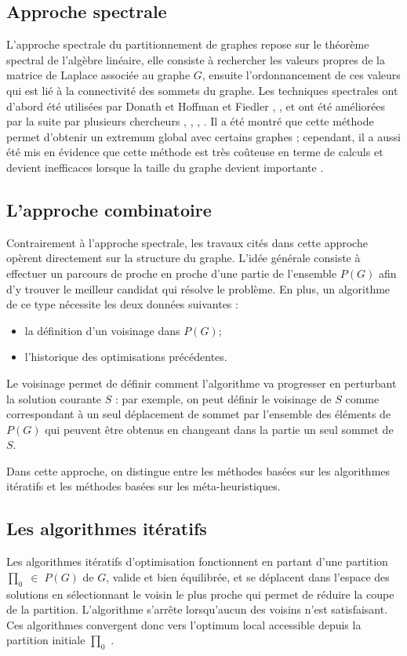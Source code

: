 \subsection*{Approche spectrale}
L'approche spectrale du partitionnement de graphes repose sur le théorème spectral de l'algèbre linéaire, elle consiste à rechercher les valeurs propres de la matrice de Laplace associée au graphe $G$, ensuite l'ordonnancement de ces valeurs qui est lié à la connectivité des sommets du graphe.
Les techniques spectrales ont d'abord été utilisées par Donath et Hoffman \citep{DonathHoffman1972} et Fiedler \citep{Fiedler1973}, \citep{Fiedler1975}, et ont été améliorées par la suite par plusieurs chercheurs \citep{Boppana1987}, \citep{HendricksonLeland1995a}, \citep{Kabelikova2006}, \citep{Simon1991}.
Il a été montré que cette méthode permet d'obtenir un extremum global avec certains graphes \citep{Pothen1990}; cependant, il a aussi été mis en évidence que cette méthode est très coûteuse en terme de calculs et devient inefficaces lorsque la taille du graphe devient importante \citep{BarnardSimon1994}.

\subsection*{L'approche combinatoire} \citep{BENSETIRA2017}
Contrairement à l'approche spectrale, les travaux cités dans cette approche opèrent directement sur la structure du graphe.
L'idée générale consiste à effectuer un parcours de proche en proche d'une partie de l'ensemble $P(G)$ afin d'y trouver le meilleur candidat qui résolve le problème. En plus, un algorithme de ce type nécessite les deux données suivantes :
\begin{itemize}
\item la définition d'un voisinage dans $P(G)$;
\item l'historique des optimisations précédentes.
\end{itemize}
Le voisinage permet de définir comment l'algorithme va progresser en perturbant la solution courante $S$ : par exemple, on peut définir le voisinage de $S$ comme correspondant à un seul déplacement de sommet par l'ensemble des éléments de $P(G)$ qui peuvent être obtenus en changeant dans la partie un seul sommet de $S$.

Dans cette approche, on distingue entre les méthodes basées sur les algorithmes itératifs et les méthodes basées sur les méta-heuristiques.

\subsection*{Les algorithmes itératifs}
Les algorithmes itératifs d'optimisation fonctionnent en partant d'une partition $\prod _0 \;\in \; P(G)$ de $G$, valide et bien équilibrée, et se déplacent dans l'espace des solutions en sélectionnant le voisin le plus proche qui permet de réduire la coupe de la partition. L'algorithme s'arrête lorsqu'aucun des voisins n'est satisfaisant. Ces algorithmes convergent donc vers l'optimum local accessible depuis la partition initiale $\prod _0$ .

